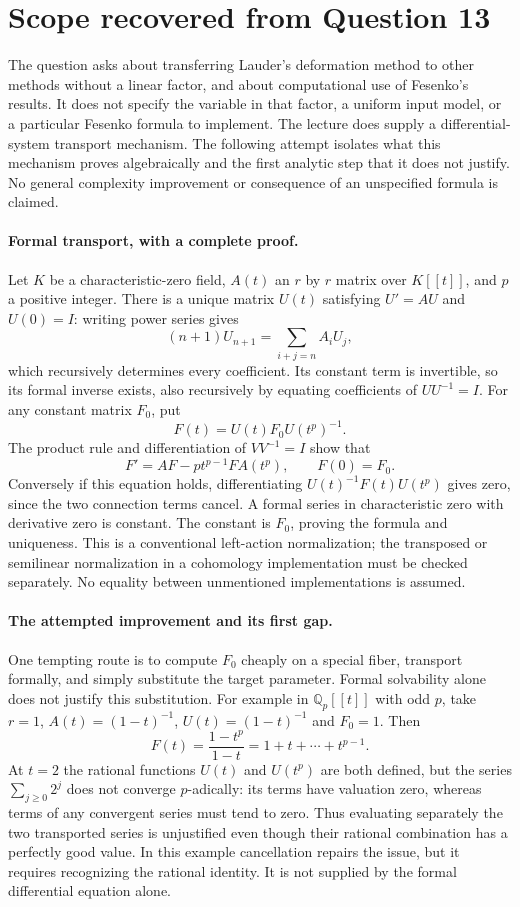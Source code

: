 \documentclass[11pt]{article}
\begin{document}
\section{Scope recovered from Question 13}
The question asks about transferring Lauder's deformation method to
other methods without a linear factor, and about computational use of
Fesenko's results. It does not specify the variable in that factor, a
uniform input model, or a particular Fesenko formula to implement.
The lecture does supply a differential-system transport mechanism.
The following attempt isolates what this mechanism proves algebraically
and the first analytic step that it does not justify. No general
complexity improvement or consequence of an unspecified formula is claimed.

\paragraph{Formal transport, with a complete proof.}
Let $K$ be a characteristic-zero field, $A(t)$ an $r$ by $r$ matrix
over $K[[t]]$, and $p$ a positive integer. There is a unique matrix
$U(t)$ satisfying $U'=AU$ and $U(0)=I$: writing power series gives
\[
(n+1)U_{n+1}=\sum_{i+j=n}A_iU_j,
\]
which recursively determines every coefficient. Its constant term is
invertible, so its formal inverse exists, also recursively by equating
coefficients of $UU^{-1}=I$. For any constant matrix $F_0$, put
\[
F(t)=U(t)F_0U(t^p)^{-1}.
\]
The product rule and differentiation of $VV^{-1}=I$ show that
\[
F'=AF-p t^{p-1}F A(t^p),\qquad F(0)=F_0.
\]
Conversely if this equation holds, differentiating
$U(t)^{-1}F(t)U(t^p)$ gives zero, since the two connection terms
cancel. A formal series in characteristic zero with derivative zero
is constant. The constant is $F_0$, proving the formula and uniqueness.
This is a conventional left-action normalization; the transposed or
semilinear normalization in a cohomology implementation must be checked
separately. No equality between unmentioned implementations is assumed.

\paragraph{The attempted improvement and its first gap.}
One tempting route is to compute $F_0$ cheaply on a special fiber,
transport formally, and simply substitute the target parameter.
Formal solvability alone does not justify this substitution. For
example in $\mathbb Q_p[[t]]$ with odd $p$, take $r=1$,
$A(t)=(1-t)^{-1}$, $U(t)=(1-t)^{-1}$ and $F_0=1$.
Then
\[
F(t)=\frac{1-t^p}{1-t}=1+t+\cdots+t^{p-1}.
\]
At $t=2$ the rational functions $U(t)$ and $U(t^p)$ are both
defined, but the series $\sum_{j\ge0}2^j$ does not converge
$p$-adically: its terms have valuation zero, whereas terms of any
convergent series must tend to zero. Thus evaluating separately the
two transported series is unjustified even though their rational
combination has a perfectly good value. In this example cancellation
repairs the issue, but it requires recognizing the rational identity.
It is not supplied by the formal differential equation alone.
\end{document}
